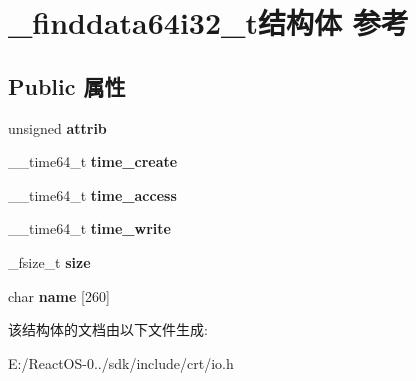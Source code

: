 \hypertarget{struct__finddata64i32__t}{}\section{\+\_\+finddata64i32\+\_\+t结构体 参考}
\label{struct__finddata64i32__t}
\subsection*{Public 属性}
\begin{DoxyCompactItemize}
\item 
\mbox{\label{struct__finddata64i32__t_aa346205ac3e4bdcd022d6bfea4d8fd5b}} 
unsigned {\bfseries attrib}
\item 
\mbox{\label{struct__finddata64i32__t_a1acee073c1a3f6f1defa6a3d5fd9ef0f}} 
\+\_\+\+\_\+time64\+\_\+t {\bfseries time\+\_\+create}
\item 
\mbox{\label{struct__finddata64i32__t_af044679e4463efa3f8ebcfccddd0be0b}} 
\+\_\+\+\_\+time64\+\_\+t {\bfseries time\+\_\+access}
\item 
\mbox{\label{struct__finddata64i32__t_a590af4a87440d47d640ca35543bd569a}} 
\+\_\+\+\_\+time64\+\_\+t {\bfseries time\+\_\+write}
\item 
\mbox{\label{struct__finddata64i32__t_ae19534392e41929ff8a42831d50caa8c}} 
\+\_\+fsize\+\_\+t {\bfseries size}
\item 
\mbox{\label{struct__finddata64i32__t_a7473df95ab0c35e0823c7cfdeb09472f}} 
char {\bfseries name} \mbox{[}260\mbox{]}
\end{DoxyCompactItemize}


该结构体的文档由以下文件生成\+:\begin{DoxyCompactItemize}
\item 
E\+:/\+React\+O\+S-\/0../sdk/include/crt/io.\+h\end{DoxyCompactItemize}
